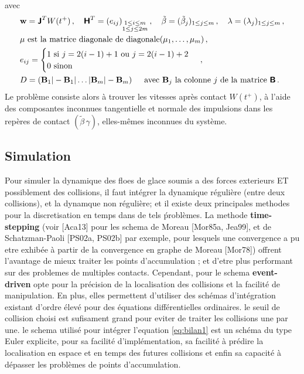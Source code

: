 avec
\begin{align*}
    &\bm{\mathrm{w}} = \bm{\mathsf{J}}^T W(t^+) \,, \quad
    \bm{\mathsf{H}}^T = (e_{ij})_{\substack{1 \leq i \leq m \\ 1 \leq j \leq 2m}} \,, \quad \tilde{\beta} = (\tilde{\beta}_j)_{1\leq j \leq m} \,, \quad \lambda = (\lambda_j)_{1 \leq j \leq m} \,, \\
    &\mu \text{ est la matrice diagonale de diagonale} (\mu_1,\dots, \mu_m) \,,\\
    &e_{ij} = \begin{cases}
        1 \text{   si } j = 2(i-1) + 1 \text{ ou } j=2(i-1) + 2 \\
        0 \text{   sinon} 
    \end{cases} \,,\\
    &D = (\bm{\mathrm{B}}_1 \vert - \bm{\mathrm{B}}_1 \vert \ldots \vert \bm{\mathrm{B}}_m \vert -\bm{\mathrm{B}}_m) \, \quad \text{ avec } \bm{\mathrm{B}}_j \text{ la colonne } j \text{ de la matrice } \bm{\mathsf{B}} \,.
\end{align*}
Le problème consiste alors à trouver les vitesses après contact $W(t^{+})$, à l’aide des composantes inconnues tangentielle et normale des impulsions dans les repères de contact $(\tilde{\beta}\, \gamma)$, elles-mêmes inconnues du système.

\subsection{Simulation}
 
Pour simuler la dynamique des floes de glace soumis a des forces exterieurs ET possiblement des collisions, il faut intégrer la dynamique régulière (entre deux collisions), et la dynamque non régulière; et il existe deux principales methodes pour la discretisation en temps dans de tels ṕroblèmes. La methode \textbf{time-stepping} (voir [Aca13] pour les schema de Moreau [Mor85a, Jea99], et de Schatzman-Paoli [PS02a, PS02b] par exemple, pour lesquels une convergence a pu etre exhibée à partir de la convergence en graphe de Moreau [Mor78]) offrent l'avantage de mieux traiter les points d'accumulation \parencite{rabatel2015thesis}; et d'etre plus performant sur des problemes de multiples contacts. Cependant, \citeauthor{rabatel2015thesis} pour le schema \textbf{event-driven} opte pour la précision de la localisation des collisions et la facilité de manipulation. En plus, elles permettent d’utiliser des schémas d’intégration existant d’ordre élevé pour des équations différentielles ordinaires. le seuil de collision choisi est sufisament grand pour eviter de traiter les collisions une par une. le schema utilisé pour intégrer l'equation \cref{eq:bilan1} est un schéma du type Euler explicite, pour sa facilité d’implémentation, sa facilité à prédire la localisation en espace et en temps des futures collisions et enfin sa capacité à dépasser les problèmes de points d’accumulation.



